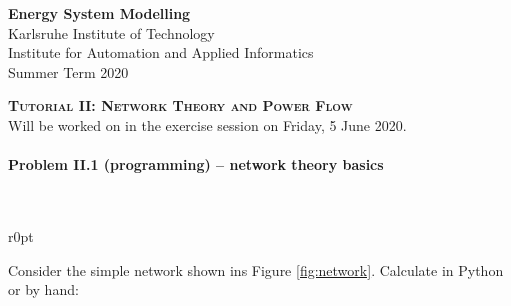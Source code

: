 \documentclass[11pt,a4paper,fleqn]{scrartcl}
\begin{document}
\begin{flushright}
 \textbf{Energy System Modelling }\\
 {\small Karlsruhe Institute of Technology}\\
 {\small Institute for Automation and Applied Informatics}\\
 {\small Summer Term 2020}\\
\end{flushright}

 
 \vspace{-0.5em}
 \hrulefill
 \vspace{0.3em}

\begin{center}
 \textbf{\textsc{\Large Tutorial II: Network Theory and Power Flow}}\\
 \small Will be worked on in the exercise session on Friday, 5 June 2020.\\[1.5em]
\end{center}

\vspace{-0.5em}
\hrulefill
\vspace{0.8em}

\paragraph{Problem II.1 (programming) -- network theory basics}~\\

\begin{wrapfigure}[10]{r}{0pt}
 \centering
 \caption{Simple Network}
 \label{fig:network}
\end{wrapfigure}


Consider the simple network shown ins Figure \ref{fig:network}. Calculate in Python or by hand:
\end{document}
